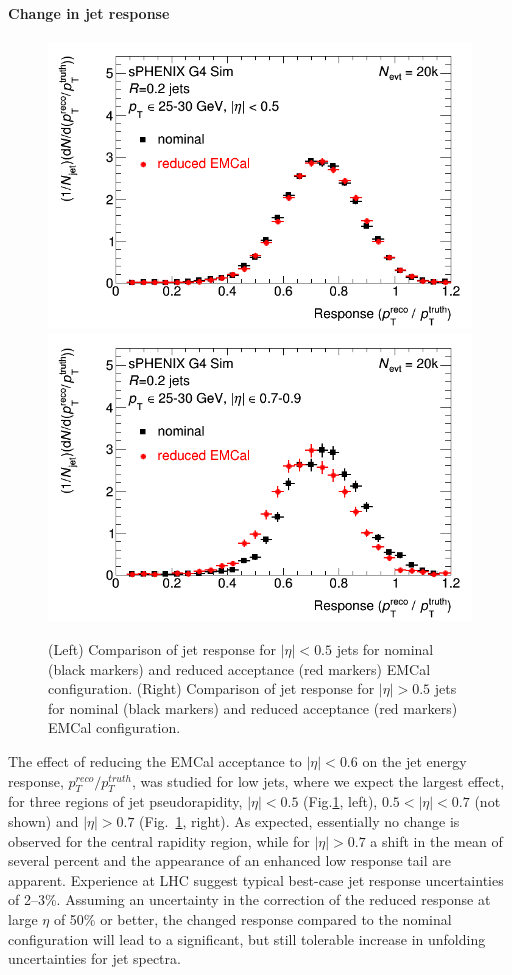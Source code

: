 \paragraph{Change in jet response} 
\begin{figure}[hbt]
  \centering
  \includegraphics[width=0.4\linewidth]{figs/jet_response_reduced_emcal_eta_0} 
  \hspace{0.1\linewidth}
  \includegraphics[width=0.4\linewidth]{figs/jet_response_reduced_emcal_eta_07}
  \caption{(Left) Comparison of jet response for $|\eta| <  0.5$ jets for nominal (black markers) and reduced acceptance (red markers) EMCal configuration.
  (Right) Comparison of jet response for $|\eta| > 0.5$ jets for nominal (black markers) and reduced acceptance (red markers) EMCal configuration.}
  \label{fig:jet_response_reduced_emcal}
\end{figure}

The effect of reducing the EMCal acceptance to $|\eta| < 0.6$ on the
jet energy response, $p_T^{reco}/p_T^{truth}$, was studied for low \pt
jets, where we expect the largest effect, for three regions of jet
pseudorapidity, $|\eta| < 0.5$
(Fig.\ref{fig:jet_response_reduced_emcal}, left), $0.5 < |\eta| < 0.7$
(not shown) and $|\eta| > 0.7$
(Fig.~\ref{fig:jet_response_reduced_emcal}, right). As expected,
essentially no change is observed for the central rapidity region,
while for $|\eta| > 0.7$ a shift in the mean of several percent and
the appearance of an enhanced low response tail are
apparent. Experience at LHC suggest typical best-case jet response
uncertainties of 2--3\%. Assuming an uncertainty in the correction of
the reduced response at large $\eta$ of 50\% or better, the changed
response compared to the nominal configuration will lead to a
significant, but still tolerable increase in unfolding uncertainties
for jet spectra.

